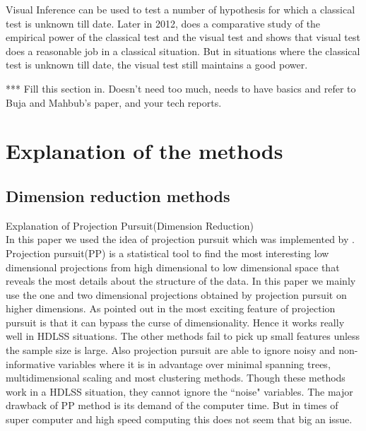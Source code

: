 \documentclass[12]{article}
\newcommand{\blue}{\color{blue}}
\begin{document}
Visual Inference can be used to test a number of hypothesis for which a classical test is unknown till date. Later in 2012, \cite{majumder:2011} does a comparative study of the empirical power of the classical test and the visual test and shows that visual test does a reasonable job in a classical situation. But in situations where the classical test is unknown till date, the visual test still maintains a good power. 



{\blue *** Fill this section in. Doesn't need too much, needs to have basics and refer to Buja and  Mahbub's paper, and your tech reports.}



\section{Explanation of the methods}

 
\subsection{Dimension reduction methods}

{\color{red} Explanation of Projection Pursuit(Dimension Reduction)} \\
In this paper we used the idea of projection pursuit which was implemented by \cite{friedman:1974}. Projection pursuit(PP) is a statistical tool to find the most interesting low dimensional projections from high dimensional to low dimensional space that reveals the most details about the structure of the data. In this paper we mainly use the one and two dimensional projections obtained by projection pursuit on higher dimensions.  As pointed out in \cite{huber:1985} the most exciting feature of projection pursuit is that it can bypass the curse of dimensionality. Hence it works really well in HDLSS situations. The other methods fail to pick up small features unless the sample size is large. Also projection pursuit are able to ignore noisy and non-informative variables where it is in advantage over minimal spanning trees, multidimensional scaling and most clustering methods. Though these methods work in a HDLSS situation, they cannot ignore the ``noise" variables. The  major drawback of PP method is its demand of the computer time. But in times of super computer and high speed computing this does not seem that big an issue.
\end{document}
